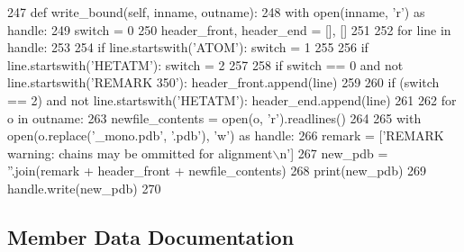 \begin{DoxyCode}
247     \textcolor{keyword}{def }write\_bound(self, inname, outname):
248         with open(inname, \textcolor{stringliteral}{'r') as handle:}
249 \textcolor{stringliteral}{            switch = 0}
250 \textcolor{stringliteral}{            header\_front, header\_end = [], []}
251 \textcolor{stringliteral}{}
252 \textcolor{stringliteral}{            }\textcolor{keywordflow}{for} line \textcolor{keywordflow}{in} handle:
253 
254                 \textcolor{keywordflow}{if} line.startswith(\textcolor{stringliteral}{'ATOM'}): switch = 1
255 
256                 \textcolor{keywordflow}{if} line.startswith(\textcolor{stringliteral}{'HETATM'}): switch = 2
257 
258                 \textcolor{keywordflow}{if} switch == 0 \textcolor{keywordflow}{and} \textcolor{keywordflow}{not} line.startswith(\textcolor{stringliteral}{'REMARK 350'}): header\_front.append(line)
259 
260                 \textcolor{keywordflow}{if} (switch == 2) \textcolor{keywordflow}{and} \textcolor{keywordflow}{not} line.startswith(\textcolor{stringliteral}{'HETATM'}): header\_end.append(line)
261 
262         \textcolor{keywordflow}{for} o \textcolor{keywordflow}{in} outname:
263             newfile\_contents = open(o, \textcolor{stringliteral}{'r').readlines()}
264 \textcolor{stringliteral}{}
265 \textcolor{stringliteral}{            with open(o.replace('\_mono.pdb'}, \textcolor{stringliteral}{'.pdb'}), \textcolor{stringliteral}{'w'}) \textcolor{keyword}{as} handle:
266                 remark = [\textcolor{stringliteral}{'REMARK warning: chains may be ommitted for alignment\(\backslash\)n'}]
267                 new\_pdb = \textcolor{stringliteral}{''}.join(remark + header\_front + newfile\_contents)
268                 print(new\_pdb)
269                 handle.write(new\_pdb)
270 
\end{DoxyCode}


\subsection{Member Data Documentation}
\mbox{\label{classfragalysis__api_1_1xcimporter_1_1align_1_1_monomerize_a20636604f47438298d2420ce35297281}} 
